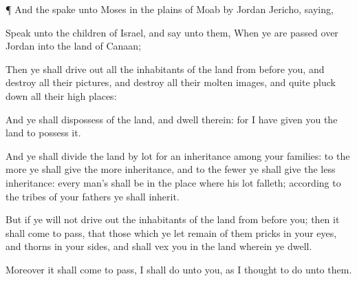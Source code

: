 {\par }{\PP {}¶ And the
{}
spake unto
Moses in the
plains of
Moab by
Jordan
{}
Jericho,
saying,

Speak unto the
children of
Israel, and
say unto them, When ye are passed
over
Jordan into the
land of
Canaan;

Then ye shall drive
out all the
inhabitants of the
land from
before you, and
destroy all their
pictures, and
destroy all their
molten
images, and quite pluck
down all their high
places:

And ye shall
dispossess
{} of the
land, and
dwell therein: for I have
given you the
land to
possess it.

And ye shall
divide the
land by
lot for an
inheritance among your
families:
{} to the
more ye shall give the
more
inheritance, and to the
fewer ye shall give the
less
inheritance: every man’s
{} shall be in the place where his
lot
falleth; according to the
tribes of your
fathers ye shall
inherit.

But if ye will not drive
out the
inhabitants of the
land from
before you; then it shall come to pass, that those which ye let
remain of them
{}
pricks in your
eyes, and
thorns in your
sides, and shall
vex you in the
land wherein ye
dwell.

Moreover it shall come to pass,
{} I shall
do unto you, as I
thought to
do unto them.




\par }
